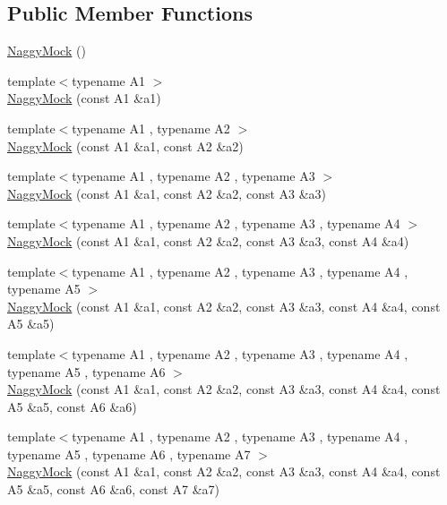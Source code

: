 \subsection*{Public Member Functions}
\begin{DoxyCompactItemize}
\item 
\hyperlink{classtesting_1_1NaggyMock_acb769f78b93eb60b04db21250f416f70}{Naggy\+Mock} ()
\item 
{\footnotesize template$<$typename A1 $>$ }\\\hyperlink{classtesting_1_1NaggyMock_ae43ea6c6a6b66fe31cb14f93e0be5718}{Naggy\+Mock} (const A1 \&a1)
\item 
{\footnotesize template$<$typename A1 , typename A2 $>$ }\\\hyperlink{classtesting_1_1NaggyMock_a4241363ab2ca3a2e7baa5ead980175e6}{Naggy\+Mock} (const A1 \&a1, const A2 \&a2)
\item 
{\footnotesize template$<$typename A1 , typename A2 , typename A3 $>$ }\\\hyperlink{classtesting_1_1NaggyMock_abd9eea0573bf39f4b41504b2d1df5311}{Naggy\+Mock} (const A1 \&a1, const A2 \&a2, const A3 \&a3)
\item 
{\footnotesize template$<$typename A1 , typename A2 , typename A3 , typename A4 $>$ }\\\hyperlink{classtesting_1_1NaggyMock_aa7d63f62600171db931c6bbb4c2a6d52}{Naggy\+Mock} (const A1 \&a1, const A2 \&a2, const A3 \&a3, const A4 \&a4)
\item 
{\footnotesize template$<$typename A1 , typename A2 , typename A3 , typename A4 , typename A5 $>$ }\\\hyperlink{classtesting_1_1NaggyMock_ac751c8a708935bd8558c9665160f7144}{Naggy\+Mock} (const A1 \&a1, const A2 \&a2, const A3 \&a3, const A4 \&a4, const A5 \&a5)
\item 
{\footnotesize template$<$typename A1 , typename A2 , typename A3 , typename A4 , typename A5 , typename A6 $>$ }\\\hyperlink{classtesting_1_1NaggyMock_aac4c0986e917a5d6e515f8dc0e7bf644}{Naggy\+Mock} (const A1 \&a1, const A2 \&a2, const A3 \&a3, const A4 \&a4, const A5 \&a5, const A6 \&a6)
\item 
{\footnotesize template$<$typename A1 , typename A2 , typename A3 , typename A4 , typename A5 , typename A6 , typename A7 $>$ }\\\hyperlink{classtesting_1_1NaggyMock_ad1edac1991dd20514e822c90d6896c74}{Naggy\+Mock} (const A1 \&a1, const A2 \&a2, const A3 \&a3, const A4 \&a4, const A5 \&a5, const A6 \&a6, const A7 \&a7)

\end{DoxyCompactItemize}
